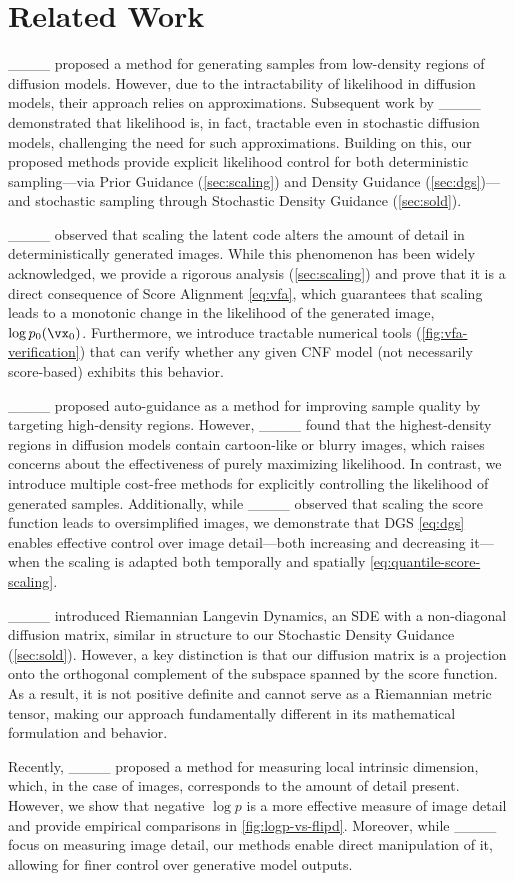 \section{Related Work}
\label{sec:related-work}

____ proposed a method for generating samples from low-density regions of diffusion models. However, due to the intractability of likelihood in diffusion models, their approach relies on approximations. Subsequent work by ____ demonstrated that likelihood is, in fact, tractable even in stochastic diffusion models, challenging the need for such approximations. Building on this, our proposed methods provide explicit likelihood control for both deterministic sampling—via Prior Guidance (\autoref{sec:scaling}) and Density Guidance (\autoref{sec:dgs})—and stochastic sampling through Stochastic Density Guidance (\autoref{sec:sold}).

____ observed that scaling the latent code alters the amount of detail in deterministically generated images.
While this phenomenon has been widely acknowledged, we provide a rigorous analysis (\autoref{sec:scaling}) and prove that it is a direct consequence of Score Alignment \autoref{eq:vfa}, which guarantees that scaling leads to a monotonic change in the likelihood of the generated image, $\log p_0(\vx_0)$.
Furthermore, we introduce tractable numerical tools (\autoref{fig:vfa-verification}) that can verify whether any given CNF model (not necessarily score-based) exhibits this behavior.

____ proposed auto-guidance as a method for improving sample quality by targeting high-density regions. However, ____ found that the highest-density regions in diffusion models contain cartoon-like or blurry images, which raises concerns about the effectiveness of purely maximizing likelihood. In contrast, we introduce multiple cost-free methods for explicitly controlling the likelihood of generated samples. Additionally, while ____ observed that scaling the score function leads to oversimplified images, we demonstrate that DGS \autoref{eq:dgs} enables effective control over image detail—both increasing and decreasing it—when the scaling is adapted both temporally and spatially \autoref{eq:quantile-score-scaling}.

____ introduced Riemannian Langevin Dynamics, an SDE with a non-diagonal diffusion matrix, similar in structure to our Stochastic Density Guidance (\autoref{sec:sold}). However, a key distinction is that our diffusion matrix is a projection onto the orthogonal complement of the subspace spanned by the score function. As a result, it is not positive definite and cannot serve as a Riemannian metric tensor, making our approach fundamentally different in its mathematical formulation and behavior.

Recently, ____ proposed a method for measuring local intrinsic dimension, which, in the case of images, corresponds to the amount of detail present. However, we show that negative $\log p$ is a more effective measure of image detail and provide empirical comparisons in \autoref{fig:logp-vs-flipd}. Moreover, while ____ focus on measuring image detail, our methods enable direct manipulation of it, allowing for finer control over generative model outputs.